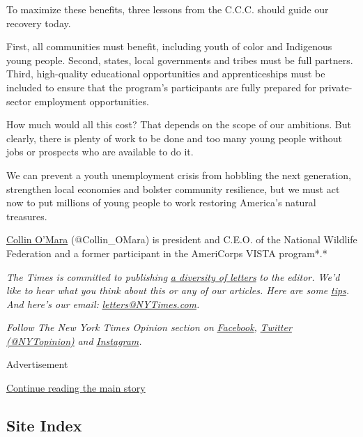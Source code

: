 To maximize these benefits, three lessons from the C.C.C. should guide
our recovery today.

First, all communities must benefit, including youth of color and
Indigenous young people. Second, states, local governments and tribes
must be full partners. Third, high-quality educational opportunities and
apprenticeships must be included to ensure that the program's
participants are fully prepared for private-sector employment
opportunities.

How much would all this cost? That depends on the scope of our
ambitions. But clearly, there is plenty of work to be done and too many
young people without jobs or prospects who are available to do it.

We can prevent a youth unemployment crisis from hobbling the next
generation, strengthen local economies and bolster community resilience,
but we must act now to put millions of young people to work restoring
America's natural treasures.

\href{https://www.nwf.org/about-us/leadership/collin-omara}{Collin
O'Mara} (@Collin\_OMara) is president and C.E.O. of the National
Wildlife Federation and a former participant in the AmeriCorps VISTA
program*.*

\emph{The Times is committed to publishing}
\href{https://www.nytimes3xbfgragh.onion/2019/01/31/opinion/letters/letters-to-editor-new-york-times-women.html}{\emph{a
diversity of letters}} \emph{to the editor. We'd like to hear what you
think about this or any of our articles. Here are some}
\href{https://help.nytimes3xbfgragh.onion/hc/en-us/articles/115014925288-How-to-submit-a-letter-to-the-editor}{\emph{tips}}\emph{.
And here's our email:}
\href{mailto:letters@NYTimes.com}{\emph{letters@NYTimes.com}}\emph{.}

\emph{Follow The New York Times Opinion section on}
\href{https://www.facebookcorewwwi.onion/nytopinion}{\emph{Facebook}}\emph{,}
\href{http://twitter.com/NYTOpinion}{\emph{Twitter (@NYTopinion)}}
\emph{and}
\href{https://www.instagram.com/nytopinion/}{\emph{Instagram}}\emph{.}

Advertisement

\protect\hyperlink{after-bottom}{Continue reading the main story}

\hypertarget{site-index}{%
\subsection{Site Index}\label{site-index}}


